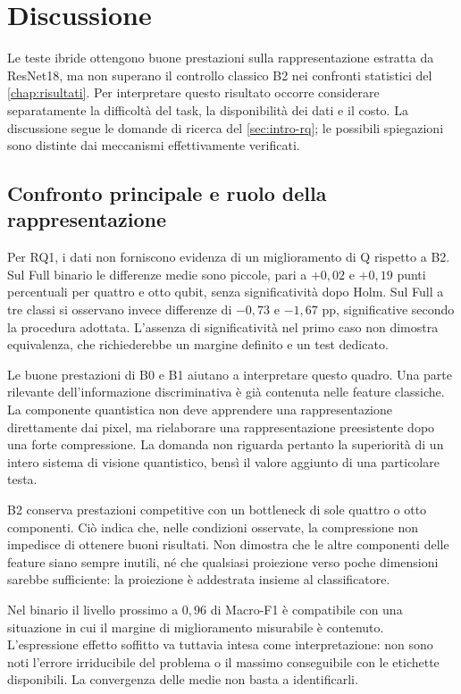 \chapter{Discussione}
\label{chap:discussione}

Le teste ibride ottengono buone prestazioni sulla rappresentazione
estratta da ResNet18, ma non superano il controllo classico B2 nei
confronti statistici del \cref{chap:risultati}. Per interpretare questo
risultato occorre considerare separatamente la difficoltà del task,
la disponibilità dei dati e il costo. La discussione segue le domande
di ricerca del \cref{sec:intro-rq}; le possibili spiegazioni sono
distinte dai meccanismi effettivamente verificati.

\section{Confronto principale e ruolo della rappresentazione}
\label{sec:disc-rq1}

Per RQ1, i dati non forniscono evidenza di un miglioramento di Q
rispetto a B2. Sul Full binario
le differenze medie sono piccole, pari a \(+0{,}02\) e \(+0{,}19\)
punti percentuali per quattro e otto qubit, senza significatività
dopo Holm. Sul Full a tre classi si osservano invece differenze di
\(-0{,}73\) e \(-1{,}67\) pp, significative secondo la procedura
adottata. L'assenza di significatività nel primo caso non dimostra
equivalenza, che richiederebbe un margine definito e un test dedicato.

Le buone prestazioni di B0 e B1 aiutano a interpretare questo quadro.
Una parte rilevante dell'informazione discriminativa è già contenuta
nelle feature classiche. La componente quantistica non deve apprendere
una rappresentazione direttamente dai pixel, ma rielaborare una
rappresentazione preesistente dopo una forte compressione. La domanda
non riguarda pertanto la superiorità di un intero sistema di visione
quantistico, bensì il valore aggiunto di una particolare testa.

B2 conserva prestazioni competitive con un bottleneck di sole quattro
o otto componenti. Ciò indica che, nelle condizioni osservate, la
compressione non impedisce di ottenere buoni risultati. Non dimostra
che le altre componenti delle feature siano sempre inutili, né che
qualsiasi proiezione verso poche dimensioni sarebbe sufficiente:
la proiezione è addestrata insieme al classificatore.

Nel binario il livello prossimo a \(0{,}96\) di Macro-F1 è compatibile
con una situazione in cui il margine di miglioramento misurabile è
contenuto. L'espressione effetto soffitto va tuttavia intesa come
interpretazione: non sono noti l'errore irriducibile del problema o
il massimo conseguibile con le etichette disponibili. La convergenza
delle medie non basta a identificarli.


